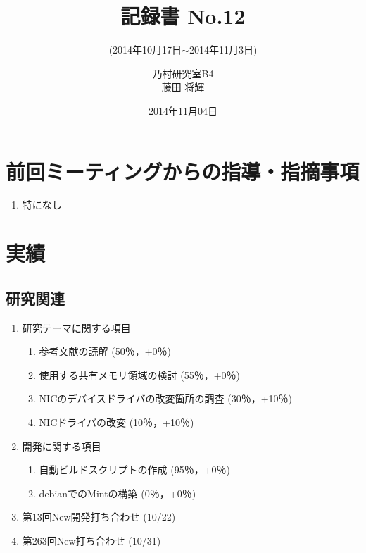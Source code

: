 \documentclass[fleqn, 14pt]{extarticle}
\subtitle{(2014年10月17日$\sim$2014年11月3日)}
\author{乃村研究室B4\\藤田 将輝}
\date{2014年11月04日}
\title{記録書 No.12}
\begin{document}
\maketitle




\section{前回ミーティングからの指導・指摘事項}
\label{sec-1}
\begin{enumerate}
\item 特になし
\newline
\hfill

\end{enumerate}




\section{実績}
\label{sec-2}

\subsection{研究関連}
\label{sec-2-1}
\begin{enumerate}
\item 研究テーマに関する項目
\hfill
\label{enum-research1}
\begin{enumerate}

\item 参考文献の読解
\hfill
\label{enum-1-A}
(50％，+0％)
\item 使用する共有メモリ領域の検討
\hfill
\label{enum-1-B}
(55％，+0％)
\item NICのデバイスドライバの改変箇所の調査
\hfill
\label{enum-1-C}
(30％，+10％)
\item NICドライバの改変
\hfill
\label{enum-1-D}
(10％，+10％)
\end{enumerate}
\item 開発に関する項目
\hfill
\label{enum-research2}
\begin{enumerate}

\item 自動ビルドスクリプトの作成
\hfill
\label{enum-2-A}
(95％，+0％)
\item debianでのMintの構築
\hfill
\label{enum-2-A}
(0％，+0％)
\end{enumerate}

\item 第13回New開発打ち合わせ
\hfill
\label{enum-3}
(10/22)
\item 第263回New打ち合わせ
\hfill
\label{enum-4}
(10/31)



\end{enumerate}
\end{document}
